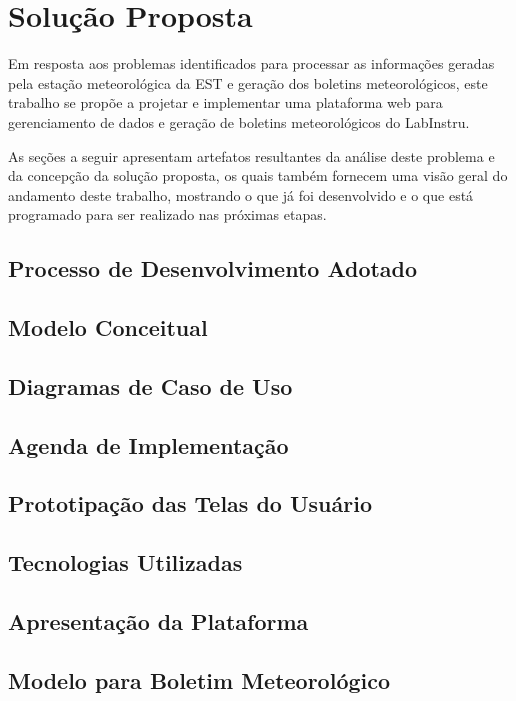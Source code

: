 \chapter{Solução Proposta}

Em resposta aos problemas identificados para processar as informações geradas pela estação meteorológica da EST e geração dos boletins meteorológicos, este trabalho se propõe a projetar e implementar uma plataforma web para gerenciamento de dados e geração de boletins meteorológicos do LabInstru.

As seções a seguir apresentam artefatos resultantes da análise deste problema e da concepção da solução proposta, os quais também fornecem uma visão geral do andamento deste trabalho, mostrando o que já foi desenvolvido e o que está programado para ser realizado nas próximas etapas.

\section{Processo de Desenvolvimento Adotado}


\section{Modelo Conceitual}


\section{Diagramas de Caso de Uso}


\section{Agenda de Implementação} \label{sec:agenda}


\section{Prototipação das Telas do Usuário}


\section{Tecnologias Utilizadas}


\section{Apresentação da Plataforma}


\section{Modelo para Boletim Meteorológico}
